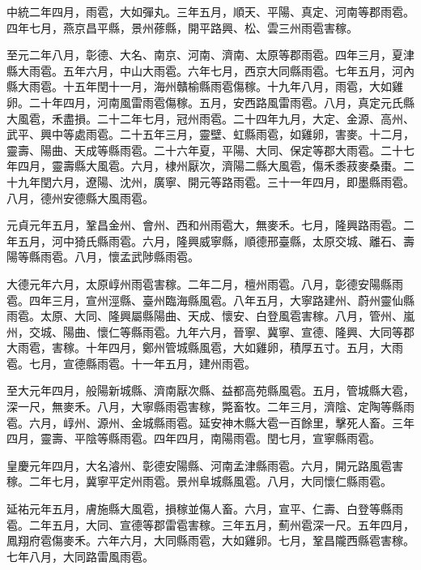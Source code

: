 \begin{pinyinscope}
 中統二年四月，雨雹，大如彈丸。三年五月，順天、平陽、真定、河南等郡雨雹。四年七月，燕京昌平縣，景州蓚縣，開平路興、松、雲三州雨雹害稼。



 至元二年八月，彰德、大名、南京、河南、濟南、太原等郡雨雹。四年三月，夏津縣大雨雹。五年六月，中山大雨雹。六年七月，西京大同縣雨雹。七年五月，河內縣大雨雹。十五年閏十一月，海州贛榆縣雨雹傷稼。十九年八月，雨雹，大如雞卵。二十年四月，河南風雷雨雹傷稼。五月，安西路風雷雨雹。八月，真定元氏縣大風雹，禾盡損。二十二年七月，冠州雨雹。二十四年九月，大定、金源、高州、武平、興中等處雨雹。二十五年三月，靈壁、虹縣雨雹，如雞卵，害麥。十二月，靈壽、陽曲、天成等縣雨雹。二十六年夏，平陽、大同、保定等郡大雨雹。二十七年四月，靈壽縣大風雹。六月，棣州厭次，濟陽二縣大風雹，傷禾黍菽麥桑棗。二十九年閏六月，遼陽、沈州，廣寧、開元等路雨雹。三十一年四月，即墨縣雨雹。八月，德州安德縣大風雨雹。



 元貞元年五月，鞏昌金州、會州、西和州雨雹大，無麥禾。七月，隆興路雨雹。二年五月，河中猗氏縣雨雹。六月，隆興威寧縣，順德邢臺縣，太原交城、離石、壽陽等縣雨雹。八月，懷孟武陟縣雨雹。



 大德元年六月，太原崞州雨雹害稼。二年二月，檀州雨雹。八月，彰德安陽縣雨雹。四年三月，宣州涇縣、臺州臨海縣風雹。八年五月，大寧路建州、蔚州靈仙縣雨雹。太原、大同、隆興屬縣陽曲、天成、懷安、白登風雹害稼。八月，管州、嵐州，交城、陽曲、懷仁等縣雨雹。九年六月，晉寧、冀寧、宣德、隆興、大同等郡大雨雹，害稼。十年四月，鄭州管城縣風雹，大如雞卵，積厚五寸。五月，大雨雹。七月，宣德縣雨雹。十一年五月，建州雨雹。



 至大元年四月，般陽新城縣、濟南厭次縣、益都高苑縣風雹。五月，管城縣大雹，深一尺，無麥禾。八月，大寧縣雨雹害稼，斃畜牧。二年三月，濟陰、定陶等縣雨雹。六月，崞州、源州、金城縣雨雹。延安神木縣大雹一百餘里，擊死人畜。三年四月，靈壽、平陰等縣雨雹。四年四月，南陽雨雹。閏七月，宣寧縣雨雹。



 皇慶元年四月，大名濬州、彰德安陽縣、河南孟津縣雨雹。六月，開元路風雹害稼。二年七月，冀寧平定州雨雹。景州阜城縣風雹。八月，大同懷仁縣雨雹。



 延祐元年五月，膚施縣大風雹，損稼並傷人畜。六月，宣平、仁壽、白登等縣雨雹。二年五月，大同、宣德等郡雷雹害稼。三年五月，薊州雹深一尺。五年四月，鳳翔府雹傷麥禾。六年六月，大同縣雨雹，大如雞卵。七月，鞏昌隴西縣雹害稼。七年八月，大同路雷風雨雹。




\end{pinyinscope}
